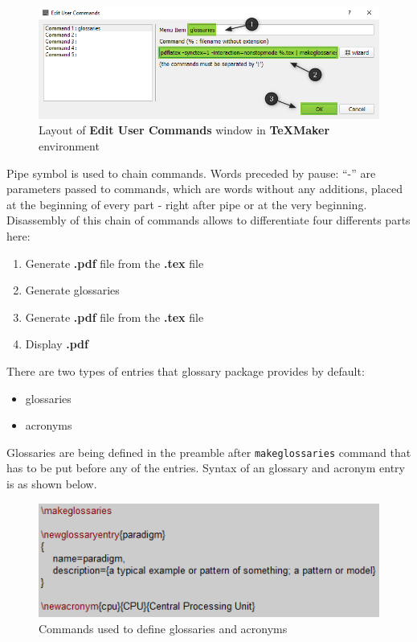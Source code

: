 \begin{figure}[H]
\centering
\includegraphics[scale=0.6]{content/LaTeX/figures/custom_command_marked.png}
\caption{Layout of \textbf{Edit User Commands} window in \textbf{TeXMaker} environment}
\end{figure}

Pipe symbol is used to chain commands. Words preceded by pause: ``-'' are parameters passed to commands, which are words without any additions, placed at the beginning of every part - right after pipe or at the very beginning. Disassembly of this chain of commands allows to differentiate four differents parts here:
\begin{enumerate}
\item Generate \textbf{.pdf} file from the \textbf{.tex} file
\item Generate glossaries
\item Generate \textbf{.pdf} file from the \textbf{.tex} file
\item Display \textbf{.pdf}
\end{enumerate}

There are two types of entries that glossary package provides by default:
\begin{itemize}
\item glossaries
\item acronyms
\end{itemize}

Glossaries are being defined in the preamble after \texttt{\bs makeglossaries} command that has to be put before any of the entries. Syntax of an glossary and acronym entry is as shown below.

\begin{figure}[H]
\centering
\includegraphics[scale=1.0]{content/LaTeX/figures/glossary_definition.png}
\caption{Commands used to define glossaries and acronyms}
\label{fig:glossary_definition}
\end{figure}

